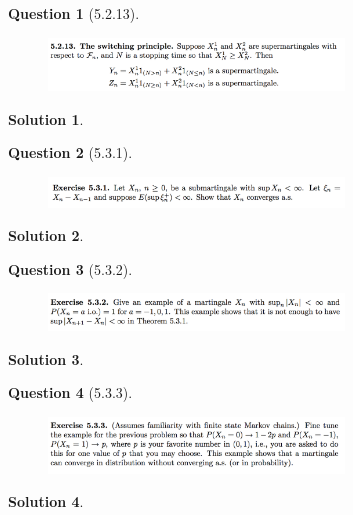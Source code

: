 \documentclass[11pt]{article}
\theoremstyle{plain}
\theoremstyle{quest}
\newtheorem*{question}{Question}
\newtheorem*{solution}{Solution}
\begin{document}
\newpage

\begin{question}[5.2.13]
\hfill
\begin{figure}[h!]
  \centering
    \includegraphics[width=0.7\textwidth]{d-5-2-13.png}
\end{figure}
\end{question}
\begin{solution} \hfill \\
\end{solution}

\newpage

\begin{question}[5.3.1]
\hfill
\begin{figure}[h!]
  \centering
    \includegraphics[width=0.7\textwidth]{d-5-3-1.png}
\end{figure}
\end{question}
\begin{solution} \hfill \\
\end{solution}

\newpage

\begin{question}[5.3.2]
\hfill
\begin{figure}[h!]
  \centering
    \includegraphics[width=0.7\textwidth]{d-5-3-2.png}
\end{figure}
\end{question}
\begin{solution} \hfill \\
\end{solution}

\newpage

\begin{question}[5.3.3]
\hfill
\begin{figure}[h!]
  \centering
    \includegraphics[width=0.7\textwidth]{d-5-3-3.png}
\end{figure}
\end{question}
\begin{solution} \hfill \\
\end{solution}
\end{document}
